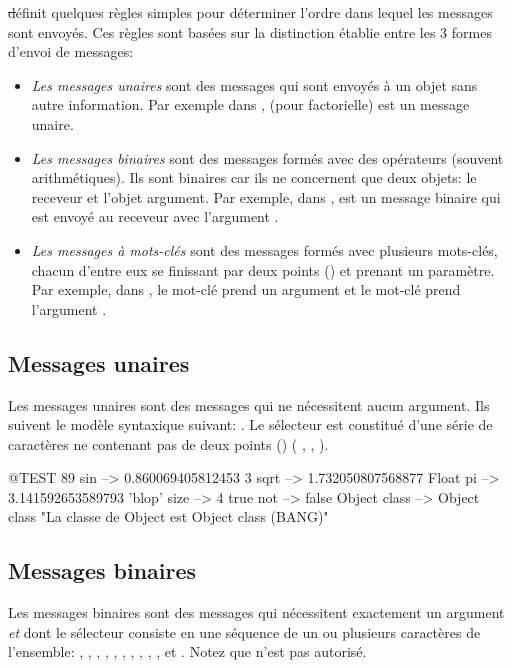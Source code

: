 \documentclass[a4paper,10pt,twoside]{book}
\begin{document}
\st définit quelques règles simples pour déterminer l'ordre dans lequel les messages sont envoyés. Ces règles sont basées sur la distinction établie entre les 3 formes d'envoi de messages: 
\begin{itemize}
\item \emph{Les messages unaires} sont des messages qui sont envoyés
  à un objet sans autre information. Par exemple dans ,  (pour factorielle) est un message unaire. 
\item  \emph{Les messages binaires} sont des messages formés avec
  des opérateurs (souvent arithmétiques). Ils sont binaires car
  ils ne concernent que deux objets: le receveur et l'objet
  argument. Par exemple, dans , \ct{+} est un message
  binaire qui est envoyé au receveur  avec l'argument . 
\item  \emph{Les messages à mots-clés} sont des messages formés avec plusieurs mots-clés, chacun d'entre eux se finissant par deux points (\ct{:}) et prenant un paramètre.
Par exemple, dans , le mot-clé 
prend un argument  et le mot-clé  prend l'argument .
\end{itemize}

\subsection{Messages unaires}
Les messages unaires sont des messages qui ne nécessitent aucun
argument. Ils suivent le modèle syntaxique suivant: . Le sélecteur est constitué d'une série de
caractères ne contenant pas de deux points (\ct{:}) (\eg
{}, , ).
\begin{code}{@TEST}
89 sin           --> 0.860069405812453
3 sqrt           --> 1.732050807568877
Float pi         --> 3.141592653589793
'blop' size     --> 4
true not        --> false
Object class --> Object class  "La classe de Object est Object class (BANG)"
\end{code}


\subsection{Messages binaires} 
Les messages binaires sont des messages qui nécessitent exactement un argument \emph{et} dont le sélecteur consiste en une séquence de un ou plusieurs caractères de l'ensemble: \ct{+}, \ct{-}, \ct{*}, \ct{/}, \ct{&}, \ct{=}, \ct{>}, \ct{|}, \ct{<}, \ct{~}, et . Notez que \ct{--} n'est pas autorisé.
\end{document}
